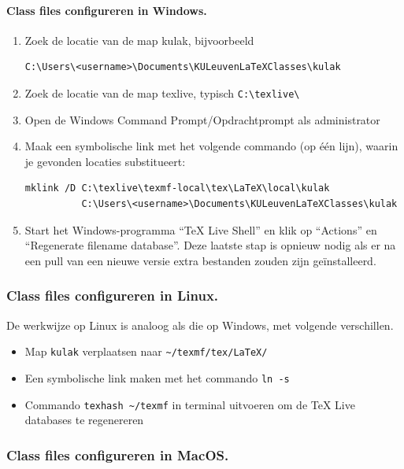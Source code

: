 \documentclass[kulak]{kulakarticle} %
\begin{document}
\paragraph{Class files configureren in Windows.}
\begin{enumerate}[resume]
	\item Zoek de locatie van de map kulak, bijvoorbeeld \begin{verbatim}
C:\Users\<username>\Documents\KULeuvenLaTeXClasses\kulak
\end{verbatim}
	\item Zoek de locatie van de map texlive, typisch \verb+C:\texlive\+
	\item Open de Windows Command Prompt/Opdrachtprompt als administrator
	\item Maak een symbolische link met het volgende commando (op één lijn), waarin je gevonden locaties substitueert:
	      \begin{verbatim}
mklink /D C:\texlive\texmf-local\tex\LaTeX\local\kulak
          C:\Users\<username>\Documents\KULeuvenLaTeXClasses\kulak
\end{verbatim}
	\item Start het Windows-programma ``TeX Live Shell'' en klik op ``Actions'' en ``Regenerate filename database''. Deze laatste stap is opnieuw nodig als er na een pull van een nieuwe versie extra bestanden zouden zijn geïnstalleerd.
\end{enumerate}

\subsubsection{Class files configureren in Linux.}
\label{sssec:linux}

De werkwijze op Linux is analoog als die op Windows, met volgende verschillen.

\begin{itemize}
	\item Map \texttt{kulak} verplaatsen naar \verb+~/texmf/tex/LaTeX/+
	\item Een symbolische link maken met het commando \texttt{ln -s }
	\item Commando \verb+texhash ~/texmf+ in terminal uitvoeren om de TeX Live databases te regenereren
\end{itemize}

\subsubsection{Class files configureren in MacOS.}
\label{sssec:macos}
\end{document}
